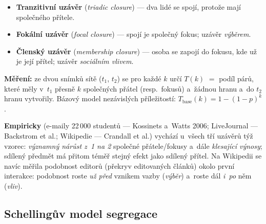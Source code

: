 \documentclass[11pt,a4paper]{article}
\theoremstyle{definition}
\begin{document}
\begin{defbox}
\begin{itemize}
\item \textbf{Tranzitivní uzávěr} (\emph{triadic closure}) --- dva lidé se spojí, protože
      mají společného přítele.
\item \textbf{Fokální uzávěr} (\emph{focal closure}) --- spojí je společný fokus; uzávěr
      \emph{výběrem}.
\item \textbf{Členský uzávěr} (\emph{membership closure}) --- osoba se zapojí do fokusu, kde
      už je její přítel; uzávěr \emph{sociálním vlivem}.
\end{itemize}
\end{defbox}

\textbf{Měření:} ze dvou snímků sítě ($t_1$, $t_2$) se pro každé $k$ určí $T(k)$ $=$ podíl
párů, které měly v~$t_1$ přesně $k$ společných přátel (resp.\ fokusů) a~žádnou hranu
a~do $t_2$ hranu vytvořily. Bázový model nezávislých příležitostí:
$T_{\text{base}}(k)=1-(1-p)^{k}$.

\textbf{Empiricky} (e-maily 22\,000 studentů --- Kossinets a~Watts 2006; LiveJournal ---
Backstrom et al.; Wikipedie --- Crandall et al.) vychází u~všech tří uzávěrů týž vzorec:
\emph{významný nárůst z~1 na 2} společné přátele/fokusy a~dále \emph{klesající výnosy};
sdílený předmět má přitom téměř stejný efekt jako sdílený přítel. Na Wikipedii se navíc
měřila podobnost editorů (překryv editovaných článků) okolo první interakce: podobnost roste
\emph{už před} vznikem vazby (\emph{výběr}) a~roste dál \emph{i~po} něm (\emph{vliv}).

\subsection{Schellingův model segregace}
\end{document}
